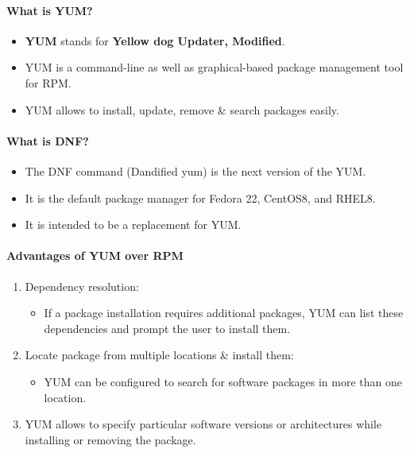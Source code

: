 \setlength{\columnsep}{3pt}
\begin{flushleft}
	\bigskip
	\paragraph{What is YUM?}
	\begin{itemize}
		\item \textbf{YUM} stands for \textbf{Yellow dog Updater, Modified}.
		\item YUM is a command-line as well as graphical-based package management tool for RPM.
		\item YUM allows to install, update, remove \& search packages easily.
	\end{itemize}

	\paragraph{What is DNF?}
	\begin{itemize}
		\item The DNF command (Dandified yum) is the next version of the YUM.
		\item It is the default package manager for Fedora 22, CentOS8, and RHEL8.
		\item It is intended to be a replacement for YUM.
	\end{itemize}

	\paragraph{Advantages of YUM over RPM}
	\begin{enumerate}
		\item Dependency resolution:
		\begin{itemize}
			\item If a package installation requires additional packages, YUM can list these dependencies and prompt the user to install them.
		\end{itemize}
		\item Locate package from multiple locations \& install them: 
		\begin{itemize}
			\item YUM can be configured to search for software packages in more than one location.
		\end{itemize}
		\item YUM allows to specify particular software versions or architectures while installing or removing the package.
		
	\end{enumerate}
\end{flushleft}
\newpage



